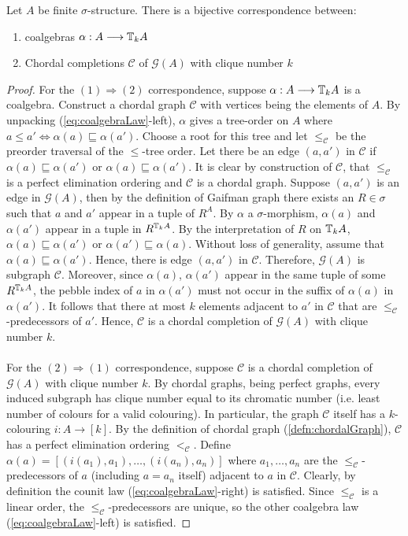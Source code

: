 \begin{prop}
Let $A$ be finite $\sigma$-structure. There is a bijective correspondence between:
\begin{enumerate}[label=(\arabic*)]
\item coalgebras $\alpha:A \longrightarrow {\mathbb{T}_{k}A}$
\item Chordal completions $\mathcal{C}$ of $\mathcal{G}(A)$ with clique number $k$
\end{enumerate}
\begin{proof}
For the $(1) \Rightarrow (2)$ correspondence, suppose $\alpha:A \longrightarrow {\mathbb{T}_{k}A}$ is a coalgebra. Construct a chordal graph $\mathcal{C}$ with vertices being the elements of $A$. By unpacking (\ref{eq:coalgebraLaw}-left), $\alpha$ gives a tree-order on $A$ where $a \leq a' \Leftrightarrow \alpha(a) \sqsubseteq \alpha(a')$. Choose a root for this tree and let $\leq_{\mathcal{C}}$ be the preorder traversal of the $\leq$-tree order. Let there be an edge $(a,a')$ in $\mathcal{C}$ if $\alpha(a) \sqsubseteq \alpha(a')$ or $\alpha(a) \sqsubseteq \alpha(a')$.   
It is clear by construction of $\mathcal{C}$, that $\leq_{\mathcal{C}}$ is a perfect elimination ordering and $\mathcal{C}$ is a chordal graph. Suppose $(a,a')$ is an edge in $\mathcal{G}(A)$, then by the definition of Gaifman graph there exists an $R \in \sigma$ such that $a$ and $a'$ appear in a tuple of $R^{A}$. By $\alpha$ a $\sigma$-morphism, $\alpha(a)$ and $\alpha(a')$ appear in a tuple in $R^{{\mathbb{T}_{k}A}}$. By the interpretation of $R$ on ${\mathbb{T}_{k}A}$, $\alpha(a) \sqsubseteq \alpha(a')$ or $\alpha(a') \sqsubseteq \alpha(a)$. Without loss of generality, assume that $\alpha(a) \sqsubseteq \alpha(a')$. Hence, there is edge $(a,a')$ in $\mathcal{C}$. Therefore, $\mathcal{G}(A)$ is subgraph $\mathcal{C}$. Moreover, since $\alpha(a)$, $\alpha(a')$ appear in the same tuple of some $R^{{\mathbb{T}_{k}A}}$, the pebble index of $a$ in $\alpha(a')$ must not occur in the suffix of $\alpha(a)$ in $\alpha(a')$. It follows that there at most $k$ elements adjacent to $a'$ in $\mathcal{C}$ that are $\leq_{\mathcal{C}}$-predecessors of $a'$. Hence, $\mathcal{C}$ is a chordal completion of $\mathcal{G}(A)$ with clique number $k$. \\~\\
For the $(2) \Rightarrow (1)$ correspondence, suppose $\mathcal{C}$ is a chordal completion of $\mathcal{G}(A)$ with clique number $k$. By chordal graphs, being perfect graphs, every induced subgraph has clique number equal to its chromatic number (i.e. least number of colours for a valid colouring). In particular, the graph $\mathcal{C}$ itself has a $k$-colouring $i:A \longrightarrow [k]$. By the definition of chordal graph (\ref{defn:chordalGraph}), $\mathcal{C}$ has a perfect elimination ordering $<_{\mathcal{C}}$. Define $\alpha(a) = [(i(a_{1}),a_{1}),\dots,(i(a_{n}),a_{n})]$ where $a_{1},\dots,a_{n}$ are the $\leq_{\mathcal{C}}$-predecessors of $a$ (including $a = a_{n}$ itself) adjacent to $a$ in $\mathcal{C}$. Clearly, by definition the counit law (\ref{eq:coalgebraLaw}-right) is satisfied. Since $\leq_{\mathcal{C}}$ is a linear order, the $\leq_{\mathcal{C}}$-predecessors are unique, so the other coalgebra law (\ref{eq:coalgebraLaw}-left) is satisfied.       

\end{proof}
\end{prop}
